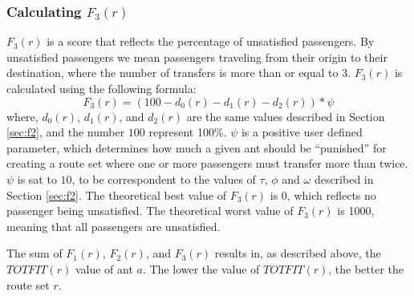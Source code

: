 \subsubsection{Calculating $F_{3}(r)$}
\label{sec:f3}
$F_3(r)$ is a score that reflects the percentage of unsatisfied passengers. By unsatisfied passengers we mean passengers traveling from their origin to their destination, where the number of transfers is more than or equal to 3. $F_3(r)$ is calculated using the following formula:
\newline
$$F_3(r) = (100 - d_0(r) - d_1(r) - d_2(r))*\psi$$
\newline
where, $d_0(r)$, $d_1(r)$, and $d_2(r)$ are the same values described in Section \vref{sec:f2}, and the number $100$ represent 100\%. $\psi$ is a positive user defined parameter, which determines how much a given ant should be ``punished'' for creating a route set where one or more passengers must transfer more than twice. $\psi$ is sat to $10$, to be correspondent to the values of $\tau$, $\phi$ and $\omega$ described in Section \vref{sec:f2}. The theoretical best value of $F_3(r)$ is 0, which reflects no passenger being unsatisfied. The theoretical worst value of $F_3(r)$ is 1000, meaning that all passengers are unsatisfied.

The sum of $F_{1}(r)$, $F_{2}(r)$, and $F_{3}(r)$ results in, as described above, the $TOTFIT(r)$ value of ant $a$. The lower the value of $TOTFIT(r)$, the better the route set $r$. 

